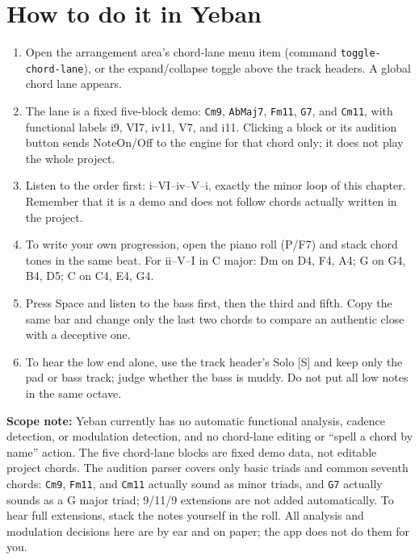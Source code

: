 \section{How to do it in Yeban}

\begin{enumerate}
  \item Open the arrangement area's chord-lane menu item (command \texttt{toggle-chord-lane}), or the expand/collapse toggle above the track headers. A global chord lane appears.
  \item The lane is a fixed five-block demo: \texttt{Cm9}, \texttt{AbMaj7}, \texttt{Fm11}, \texttt{G7}, and \texttt{Cm11}, with functional labels i9, VI7, iv11, V7, and i11. Clicking a block or its audition button sends NoteOn/Off to the engine for that chord only; it does not play the whole project.
  \item Listen to the order first: i--VI--iv--V--i, exactly the minor loop of this chapter. Remember that it is a demo and does not follow chords actually written in the project.
  \item To write your own progression, open the piano roll (P/F7) and stack chord tones in the same beat. For ii--V--I in C major: Dm on D4, F4, A4; G on G4, B4, D5; C on C4, E4, G4.
  \item Press Space and listen to the bass first, then the third and fifth. Copy the same bar and change only the last two chords to compare an authentic close with a deceptive one.
  \item To hear the low end alone, use the track header's Solo [S] and keep only the pad or bass track; judge whether the bass is muddy. Do not put all low notes in the same octave.
\end{enumerate}


\textbf{Scope note:} Yeban currently has no automatic functional analysis, cadence detection, or modulation detection, and no chord-lane editing or ``spell a chord by name'' action. The five chord-lane blocks are fixed demo data, not editable project chords. The audition parser covers only basic triads and common seventh chords: \texttt{Cm9}, \texttt{Fm11}, and \texttt{Cm11} actually sound as minor triads, and \texttt{G7} actually sounds as a G major triad; 9/11/\sharpsym{}9 extensions are not added automatically. To hear full extensions, stack the notes yourself in the roll. All analysis and modulation decisions here are by ear and on paper; the app does not do them for you.

